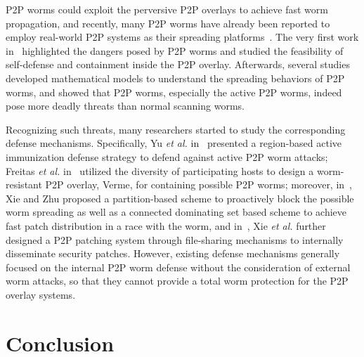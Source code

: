 \documentclass[times,10pt,twocolumn]{article}
\begin{document}
P2P worms could exploit the perversive P2P overlays to achieve fast
worm propagation, and recently, many P2P worms have already been
reported to employ real-world P2P systems as their spreading
platforms~\cite{p2p-worm-website,1639704,shin2006malware}. The very
first work in~\cite{DBLP:conf/iptps/ZhouZMICC05} highlighted the
dangers posed by P2P worms and studied the feasibility of
self-defense and containment inside the P2P overlay. Afterwards,
several studies~\cite{1146876,1639704} developed mathematical models
to understand the spreading behaviors of P2P worms, and showed that
P2P worms, especially the active P2P worms, indeed pose more deadly
threats than normal scanning worms.

Recognizing such threats, many researchers started to study the
corresponding defense mechanisms. Specifically, Yu \emph{et al.}
in~\cite{1577951} presented a region-based active immunization
defense strategy to defend against active P2P worm attacks; Freitas
\emph{et al.} in~\cite{FreitasRRFR07} utilized the diversity of
participating hosts to design a worm-resistant P2P overlay, Verme,
for containing possible P2P worms; moreover, in~\cite{1307179}, Xie
and Zhu proposed a partition-based scheme to proactively block the
possible worm spreading as well as a connected dominating set based
scheme to achieve fast patch distribution in a race with the worm,
and in~\cite{XieSZ08}, Xie \emph{et al.} further designed a P2P
patching system through file-sharing mechanisms to internally
disseminate security patches. However, existing defense mechanisms
generally focused on the internal P2P worm defense without the
consideration of external worm attacks, so that they cannot provide
a total worm protection for the P2P overlay systems.









\section{Conclusion}
\label{Conclusions}
\end{document}
